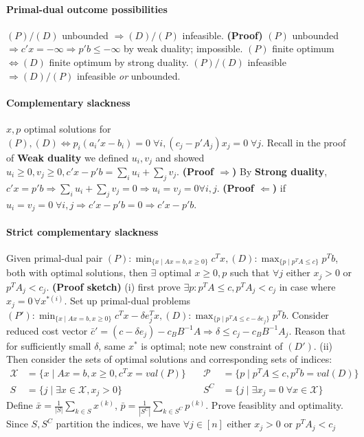 \documentclass{article}
\begin{document}
\paragraph{Primal-dual outcome possibilities} $(P) / (D)$ unbounded $\Rightarrow (D) / (P)$ infeasible. \textbf{(Proof)} $(P)$ unbounded $\Rightarrow c'x = -\infty \Rightarrow p'b \leq -\infty$ by weak duality; impossible. $(P)$ finite optimum $\iff (D)$ finite optimum by strong duality. $(P) / (D)$ infeasible $\Rightarrow (D) / (P)$ infeasible \textit{or} unbounded.

\paragraph{Complementary slackness}
$x,p$ optimal solutions for $(P),(D) \iff p_i(a_i'x - b_i) = 0 \; \forall i, (c_j - p'A_j)x_j = 0 \; \forall j$. Recall in the proof of \textbf{Weak duality} we defined $u_i, v_j$ and showed $u_i \geq 0, v_j \geq 0, c'x-p'b = \sum_iu_i + \sum_jv_j$. \textbf{(Proof $\Rightarrow$)} By \textbf{Strong duality}, $c'x = p'b \Longrightarrow \sum_iu_i + \sum_jv_j = 0 \Longrightarrow u_i = v_j = 0 \forall i,j$. \textbf{(Proof $\Leftarrow$)} if $u_i = v_j = 0\;\forall i,j \Longrightarrow c'x - p'b = 0 \Longrightarrow c'x - p'b$.  


\paragraph{Strict complementary slackness}
Given primal-dual pair $(P): \min_{\{x \mid Ax = b, x \geq 0\}} c^Tx, (D): \max_{\{p \mid p^TA \leq c\}} p^Tb$, both with optimal solutions, then $\exists$ optimal $x\geq 0, p$ such that $\forall j$ either $x_j > 0$ or $p^TA_j < c_j$. \textbf{(Proof sketch)} (i) first prove $\exists p:p^TA\leq c, p^TA_j < c_j$ in case where $x_j = 0\, \forall x^{*(i)}$. Set up primal-dual problems $(P'): \min_{\{x \mid Ax = b, x \geq 0\}} c^Tx - \delta e_j^Tx, (D): \max_{\{p \mid p^TA \leq c - \delta e_j\}} p^Tb$. Consider reduced cost vector $\bar c' = (c - \delta e_j) - c_BB^{-1}A \Longrightarrow \delta \leq  c_j - c_BB^{-1}A_j$. Reason that for sufficiently small $\delta$, same $x^*$ is optimal; note new constraint of $(D')$. (ii) Then consider the sets of optimal solutions and corresponding sets of indices: 
\begin{align*}
  \mathcal X &= \{x \mid Ax = b, x\geq 0, c^Tx = val(P)\} &\quad \mathcal P &= \{p \mid p^TA \leq c, p^Tb = val(D)\}\\
  S &= \{j \mid \exists x \in \mathcal X, x_j > 0\} &\quad S^C &= \{j \mid \exists x_j = 0 \;\forall x \in \mathcal X\}
\end{align*}
Define $\bar x = \frac{1}{|S|} \sum_{k \in S} x^{(k)}$, $\bar p = \frac{1}{|S^C|} \sum_{k \in S^C} p^{(k)}$. Prove feasiblity and optimality. Since $S, S^C$ partition the indices, we have $\forall j \in [n]$ either $x_j > 0$ or $p^TA_j < c_j$
\end{document}
